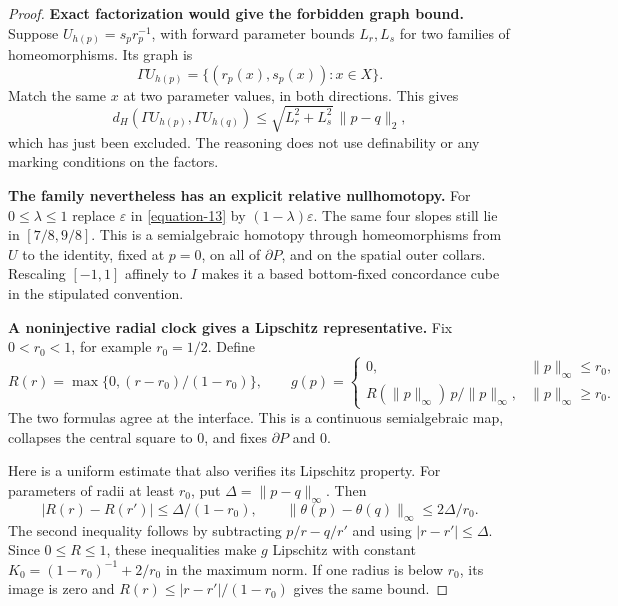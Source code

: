 \documentclass[11pt,a4paper]{article}
\theoremstyle{definition}
\begin{document}
\begin{proof}
\textbf{Exact factorization would give the forbidden graph bound.}
Suppose $U_{h(p)}=s_pr_p^{-1}$, with forward parameter bounds
$L_r,L_s$ for two families of homeomorphisms. Its graph is
\[
      \Gamma U_{h(p)}
            =\{(r_p(x),s_p(x)):x\in X\}.
\]
Match the same $x$ at two parameter values, in both directions.
This gives
\begin{equation}
 d_H(\Gamma U_{h(p)},\Gamma U_{h(q)})
                 \le\sqrt{L_r^2+L_s^2}\,\|p-q\|_2,
 \label{equation-24}
\end{equation}
which has just been excluded. The reasoning does not use
definability or any marking conditions on the factors.

\textbf{The family nevertheless has an explicit relative nullhomotopy.}
For $0\le\lambda\le1$ replace $\varepsilon$ in \eqref{equation-13} by
$(1-\lambda)\varepsilon$. The same four slopes still lie in
$[7/8,9/8]$. This is a semialgebraic homotopy through
homeomorphisms from $U$ to the identity, fixed at $p=0$,
on all of $\partial P$, and on the spatial outer collars.
Rescaling $[-1,1]$ affinely to $I$ makes it a based
bottom-fixed concordance cube in the stipulated convention.

\textbf{A noninjective radial clock gives a Lipschitz representative.}
Fix $0<r_0<1$, for example $r_0=1/2$. Define
\begin{equation}
 R(r)=\max\{0,(r-r_0)/(1-r_0)\},\qquad
 g(p)=
 \begin{cases}
 0,&\|p\|_\infty\le r_0,\\
 R(\|p\|_\infty)\,p/\|p\|_\infty,
                         &\|p\|_\infty\ge r_0 .
 \end{cases}
 \label{equation-25}
\end{equation}
The two formulas agree at the interface. This is a continuous
semialgebraic map, collapses the central square to $0$, and fixes
$\partial P$ and $0$.

Here is a uniform estimate that also verifies its Lipschitz property.
For parameters of radii at least $r_0$, put
$\Delta=\|p-q\|_\infty$. Then
\begin{equation}
 |R(r)-R(r')|\le\Delta/(1-r_0),\qquad
       \|\theta(p)-\theta(q)\|_\infty\le2\Delta/r_0.
 \label{equation-26}
\end{equation}
The second inequality follows by subtracting $p/r-q/r'$ and
using $|r-r'|\le\Delta$. Since $0\le R\le1$, these inequalities
make $g$ Lipschitz with constant
$K_0=(1-r_0)^{-1}+2/r_0$ in the maximum norm.
If one radius is below $r_0$, its image is zero and
$R(r)\le|r-r'|/(1-r_0)$ gives the same bound.


\end{proof}
\end{document}
